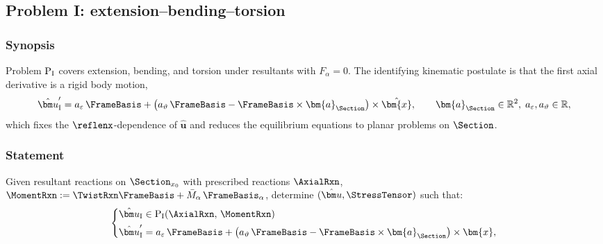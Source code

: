 \subsection{Problem I: extension--bending--torsion}

\subsubsection*{Synopsis}
Problem \(\mathrm{P}_{\rm I}\) covers extension, bending, and torsion under resultants with \(F_\alpha=0\). The identifying kinematic postulate is that the first axial derivative is a rigid body motion,
\[
\hat{\bm u}'_{\rm I}= a_{\varepsilon}\,\FrameBasis
+\big(a_{\vartheta}\,\FrameBasis-\FrameBasis\times\bm{a}_{\Section}\big)\times\hat{\bm{x}},
\qquad
\bm{a}_{\Section}\in\mathbb{R}^2,\; a_{\varepsilon},a_{\vartheta}\in\mathbb{R},
\]
which fixes the \(\reflenx\)-dependence of \(\hat{\bm u}\) and reduces the equilibrium equations to planar problems on \(\Section\).

\subsubsection*{Statement}
Given resultant reactions on \(\Section_{x_0}\) with prescribed reactions \(\AxialRxn\), \(\MomentRxn:=\TwistRxn\FrameBasis + \bar{M}_{\alpha}\,\FrameBasis_{\alpha}\),
determine \((\hat{\bm u},\StressTensor)\) such that:
\begin{equation}
\left\{
\begin{aligned}
\hat{\bm u}_{\rm I} &\in \mathrm{P}_{\rm I}(\AxialRxn,\,\MomentRxn) \\
\hat{\bm u}'_{\rm I}&= a_{\varepsilon}\,\FrameBasis
+\big(a_{\vartheta}\,\FrameBasis-\FrameBasis\times\bm{a}_{\Section}\big)\times\bm{x},
\end{aligned}
\right.
\label{eq:iesan-problem-1}
\end{equation}

